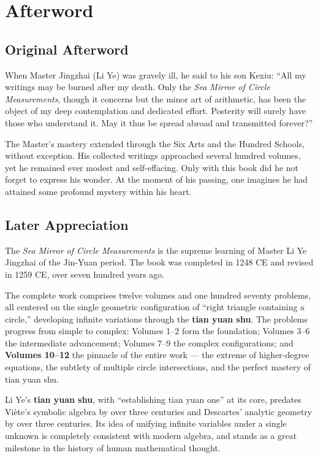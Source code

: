 \documentclass[11pt,a4paper]{book}
\begin{document}
\chapter{Afterword}
\label{app:afterword}

\section{Original Afterword}

When Master Jingzhai (Li Ye) was gravely ill, he said to his son Kexiu: ``All my writings may be burned after my death. Only the \textit{Sea Mirror of Circle Measurements}, though it concerns but the minor art of arithmetic, has been the object of my deep contemplation and dedicated effort. Posterity will surely have those who understand it. May it thus be spread abroad and transmitted forever?''

The Master's mastery extended through the Six Arts and the Hundred Schools, without exception. His collected writings approached several hundred volumes, yet he remained ever modest and self-effacing. Only with this book did he not forget to express his wonder. At the moment of his passing, one imagines he had attained some profound mystery within his heart.

\section{Later Appreciation}

The \textit{Sea Mirror of Circle Measurements} is the supreme learning of Master Li Ye Jingzhai of the Jin-Yuan period. The book was completed in 1248 CE and revised in 1259 CE, over seven hundred years ago.

The complete work comprises twelve volumes and one hundred seventy problems, all centered on the single geometric configuration of ``right triangle containing a circle,'' developing infinite variations through the \textbf{tian yuan shu}. The problems progress from simple to complex: Volumes 1--2 form the foundation; Volumes 3--6 the intermediate advancement; Volumes 7--9 the complex configurations; and \textbf{Volumes 10--12} the pinnacle of the entire work --- the extreme of higher-degree equations, the subtlety of multiple circle intersections, and the perfect mastery of tian yuan shu.

Li Ye's \textbf{tian yuan shu}, with ``establishing tian yuan one'' at its core, predates Vi\`ete's symbolic algebra by over three centuries and Descartes' analytic geometry by over three centuries. Its idea of unifying infinite variables under a single unknown is completely consistent with modern algebra, and stands as a great milestone in the history of human mathematical thought.
\end{document}
